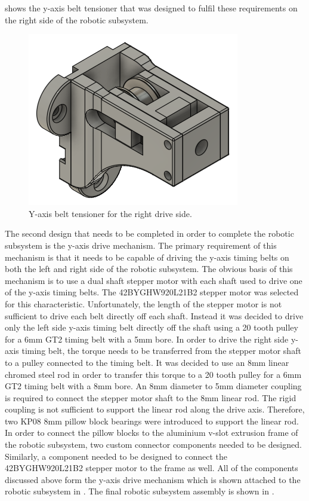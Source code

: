  shows the y-axis belt tensioner that was designed to fulfil these requirements on the right side of the robotic subsystem.

\begin{figure}[H]
	\centering
	\includegraphics[width=0.4\linewidth]{figures/202108/y-axis-belt-tensioner-right.png}
	\caption{Y-axis belt tensioner for the right drive side.}
	\label{fig:y-axis-belt-tensioner-right}
\end{figure}

The second design that needs to be completed in order to complete the robotic subsystem is the y-axis drive mechanism. The primary requirement of this mechanism is that it needs to be capable of driving the y-axis timing belts on both the left and right side of the robotic subsystem. The obvious basis of this mechanism is to use a dual shaft stepper motor with each shaft used to drive one of the y-axis timing belts. The 42BYGHW920L21B2 stepper motor was selected for this characteristic. Unfortunately, the length of the stepper motor is not sufficient to drive each belt directly off each shaft. Instead it was decided to drive only the left side y-axis timing belt directly off the shaft using a 20 tooth pulley for a 6mm GT2 timing belt with a 5mm bore. In order to drive the right side y-axis timing belt, the torque needs to be transferred from the stepper motor shaft to a pulley connected to the timing belt. It was decided to use an 8mm linear chromed steel rod in order to transfer this torque to a 20 tooth pulley for a 6mm GT2 timing belt with a 8mm bore. An 8mm diameter to 5mm diameter coupling is required to connect the stepper motor shaft to the 8mm linear rod. The rigid coupling is not sufficient to support the linear rod along the drive axis. Therefore, two KP08 8mm pillow block bearings were introduced to support the linear rod. In order to connect the pillow blocks to the aluminium v-slot extrusion frame of the robotic subsystem, two custom connector components needed to be designed. Similarly, a component needed to be designed to connect the 42BYGHW920L21B2 stepper motor to the frame as well. All of the components discussed above form the y-axis drive mechanism which is shown attached to the robotic subsystem in . The final robotic subsystem assembly is shown in .

